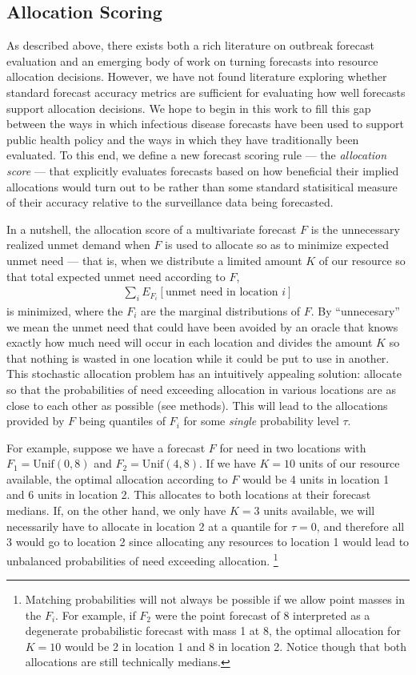 \documentclass{article}
\begin{document}
\subsection{Allocation Scoring}

As described above, there exists both a rich literature on outbreak forecast evaluation and an emerging body of work on turning forecasts into resource allocation decisions. 
However, we have not found literature exploring whether standard forecast accuracy metrics are sufficient for evaluating how well forecasts support allocation decisions.
We hope to begin in this work to fill this gap between the ways in which infectious disease forecasts have been used to support public health policy and the ways in which they have traditionally been evaluated. 
To this end, we define a new forecast scoring rule --- the {\em allocation score} --- that explicitly evaluates forecasts based on how beneficial their implied allocations would turn out to be rather than some standard statisitical measure of their accuracy relative to the surveillance data being forecasted.

In a nutshell, the allocation score of a multivariate forecast $F$ is the unnecessary realized unmet demand when $F$ is used to allocate so as to minimize expected unmet 
need --- that is, when we distribute a limited amount $K$ of our resource so that total expected unmet need according to $F$,
\begin{align}
\sum_i E_{F_i}[\text{unmet need in location $i$}]
\end{align}
is minimized, where the $F_i$ are the marginal distributions of $F$. By ``unnecesary'' we mean the unmet need that could have been avoided by an oracle that knows exactly how much need will occur in each location and divides the amount $K$ so that nothing is wasted in one location while it could be put to use in another.
This stochastic allocation problem has an intuitively appealing solution: allocate so that the probabilities of need exceeding allocation 
in various locations are as close to each other as possible (see methods).  This will lead to the allocations provided by $F$ being quantiles of $F_i$ for some \emph{single} probability level $\tau$.

For example, suppose we have a forecast $F$ for need in two locations with $F_1 = \mathrm{Unif}(0,8)$ and $F_2 = \mathrm{Unif}(4,8)$. If we have $K = 10$ units
of our resource available, the optimal allocation according to $F$ would be 4 units in location 1 and 6 units in location 2. This allocates to both locations at their forecast medians.  If, on the other hand, we only have $K = 3$ units available, we will necessarily have to allocate in location 2 at a quantile for $\tau = 0$, and therefore all 3 would go to location 2 since allocating any resources to location 1 would lead to unbalanced probabilities of need exceeding allocation. 
\footnote{Matching probabilities will not always be possible if we allow point masses in the $F_i$.  For example, if $F_2$ were the point forecast of 8 interpreted as a degenerate probabilistic forecast with mass 1 at 8, the optimal allocation for $K = 10$ would be 2 in location 1 and 8 in location 2. Notice though that both allocations are still technically medians.}
\end{document}
